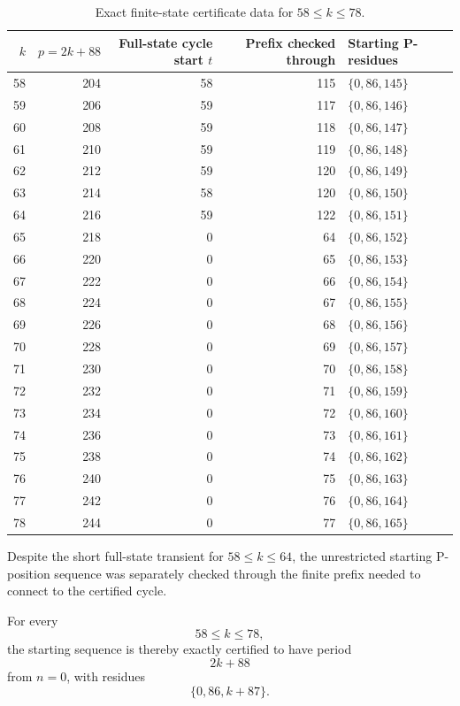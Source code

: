 \documentclass[11pt]{article}
\begin{document}
\begin{table}[htbp]
\centering
\caption{Exact finite-state certificate data for $58\le k\le78$.}
\label{tab:certificates}
\small
\begin{tabular}{@{}rrrrl@{}}
\toprule
$k$ & $p=2k+88$ & Full-state cycle start $t$ & Prefix checked through & Starting P-residues \\
\midrule
58 & 204 & 58 & 115 & $\{0,86,145\}$ \\
59 & 206 & 59 & 117 & $\{0,86,146\}$ \\
60 & 208 & 59 & 118 & $\{0,86,147\}$ \\
61 & 210 & 59 & 119 & $\{0,86,148\}$ \\
62 & 212 & 59 & 120 & $\{0,86,149\}$ \\
63 & 214 & 58 & 120 & $\{0,86,150\}$ \\
64 & 216 & 59 & 122 & $\{0,86,151\}$ \\
65 & 218 & 0 & 64 & $\{0,86,152\}$ \\
66 & 220 & 0 & 65 & $\{0,86,153\}$ \\
67 & 222 & 0 & 66 & $\{0,86,154\}$ \\
68 & 224 & 0 & 67 & $\{0,86,155\}$ \\
69 & 226 & 0 & 68 & $\{0,86,156\}$ \\
70 & 228 & 0 & 69 & $\{0,86,157\}$ \\
71 & 230 & 0 & 70 & $\{0,86,158\}$ \\
72 & 232 & 0 & 71 & $\{0,86,159\}$ \\
73 & 234 & 0 & 72 & $\{0,86,160\}$ \\
74 & 236 & 0 & 73 & $\{0,86,161\}$ \\
75 & 238 & 0 & 74 & $\{0,86,162\}$ \\
76 & 240 & 0 & 75 & $\{0,86,163\}$ \\
77 & 242 & 0 & 76 & $\{0,86,164\}$ \\
78 & 244 & 0 & 77 & $\{0,86,165\}$ \\
\bottomrule
\end{tabular}
\end{table}

Despite the short full-state transient for $58\le k\le64$, the unrestricted starting P-position sequence was separately checked through the finite prefix needed to connect to the certified cycle.

For every
\begin{equation}
    58\le k\le78,
\end{equation}
the starting sequence is thereby exactly certified to have period
\begin{equation}
\boxed{2k+88}
\end{equation}
from $n=0$, with residues
\begin{equation}
\boxed{
    \{0,86,k+87\}.
}
\end{equation}
\end{document}
